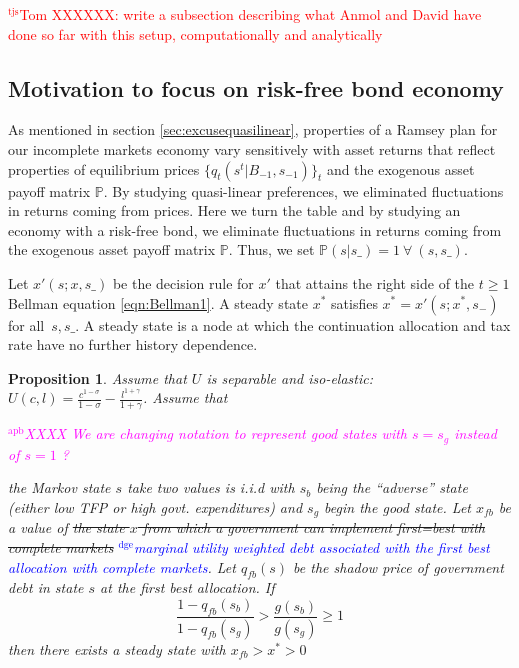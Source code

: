 \documentclass[12pt]{article}
\newcommand{\dge}[1]{\textcolor{blue}{$^{\textrm{dge}}${#1}}}
\newcommand{\apb}[1]{\textcolor{magenta}{$^{\textrm{apb}}${#1}}}
\newcommand{\tjs}[1]{\textcolor{red}{$^{\textrm{tjs}}${#1}}}
\newtheorem{proposition}[theorem]{Proposition}
\begin{document}
\tjs{Tom XXXXXX: write a subsection describing what Anmol and David have done so far with this setup, computationally
and analytically}

\subsection{Motivation to focus on risk-free bond economy\label{sec:riskfreeonly}}

As mentioned in section \ref{sec:excusequasilinear},  properties of a Ramsey plan for our incomplete markets economy vary sensitively  with   asset returns that reflect
	properties of equilibrium prices $\{q_t(s^t|B_{-1},s_{-1})\}_t$ and the exogenous asset payoff matrix $\mathbb{P}$.  By studying
quasi-linear preferences, we eliminated fluctuations in returns coming from prices.  Here we turn the table and by studying an economy
with a risk-free bond, we eliminate fluctuations in returns coming from the exogenous asset payoff matrix $\mathbb{P}$.
Thus, we set $\mathbb{P}(s|s\_)=1 \ \forall \ (s,s\_)$.  



Let $x'\left( s;{x},s\_\right) $ be the decision rule for $x'$ that attains the right side of the $t\geq1$ Bellman equation
\eqref{eqn:Bellman1}.  A steady state  ${x}^{*} $  satisfies ${ x}^{*}  =x' \left( s;{x}^{*},s_{-}\right) $ for all $%
\,s,s\_$. 
A steady state is a node at which the  continuation allocation and tax rate have no further history dependence. 

\begin{proposition}\label{prop:existenceU}  
Assume that $U$ is  separable and iso-elastic:	 $U(c,l) = \frac{c^{1-\sigma}}{1-\sigma} -\frac{ l^{1+\gamma}}{1+\gamma}$.
Assume that 

\apb{XXXX We are changing notation to represent good states with $s=s_g$ instead of $s=1$ ?}

	 the Markov state $s$ take two values is  i.i.d with $s_b$  being the ``adverse'' state (either low TFP or high govt. expenditures)
and $s_g$ begin the good state.
		Let $x_{fb}$ be a value of \st{the state $x$ from which a government can implement first=best with complete markets} \dge{marginal utility weighted debt associated with the first best allocation with complete markets}.
	 Let $q_{fb}(s)$ be the shadow price of government debt in state $s$ at the first best allocation.
	If
	\begin{equation}\label{eqn:prop52sufficient}
		\frac{1-q_{fb}(s_b)}{1-q_{fb}(s_g)} > \frac{g(s_b)}{g(s_g)}\geq 1
	\end{equation}
		then there exists a steady state with $x_{fb}>x^*>0$
		\end{proposition}
\end{document}
